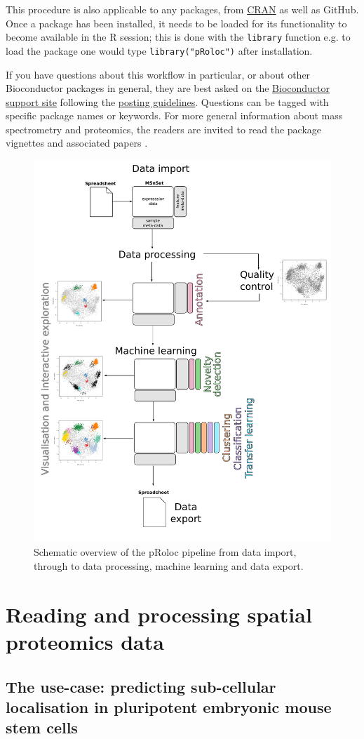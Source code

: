 This procedure is also applicable to any packages, from
\href{https://cran.r-project.org/}{CRAN} as well as GitHub. Once a
package has been installed, it needs to be loaded for its
functionality to become available in the R session; this is done with
the \texttt{library} function e.g.  to load the  package one
would type \texttt{library("pRoloc")} after installation.

\bigskip

If you have questions about this workflow in particular, or about
other Bioconductor packages in general, they are best asked on the
\href{https://support.bioconductor.org/}{Bioconductor support site}
following the
\href{http://www.bioconductor.org/help/support/posting-guide/}{posting
  guidelines}. Questions can be tagged with specific package names or
keywords. For more general information about mass spectrometry and
proteomics, the readers are invited to read the
 package vignettes and associated
papers \cite{Gatto:2014,Gatto:2015}.

\begin{figure}[!ht]
  \centering
  \includegraphics[width=.5\textwidth]{./Figures/overview.pdf}
  \caption{Schematic overview of the pRoloc pipeline from data import, through to data processing, machine learning and data export.}
  \label{fig:overview}
\end{figure}


\section*{Reading and processing spatial proteomics data}

\subsection*{The use-case: predicting sub-cellular localisation in pluripotent embryonic mouse stem cells}

